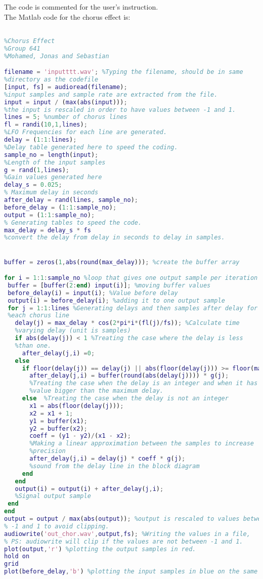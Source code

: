 \begin{lstlisting}[language=Matlab, caption= Matlab code for flanger effect]
\end{lstlisting}


The code is commented for the user's instruction.\\

The Matlab code for the chorus effect is:

\begin{lstlisting}[language=Matlab, caption= Matlab code for chorus effect]

%Chorus Effect
%Group 641
%Mohamed, Jonas and Sebastian

filename = 'inputttt.wav'; %Typing the filename, should be in same 
%directory as the codefile
[input, fs] = audioread(filename);
%input samples and sample rate are extracted from the file.
input = input / (max(abs(input)));
%the input is rescaled in order to have values between -1 and 1.
lines = 5; %number of chorus lines 
fl = randi(10,1,lines);
%LFO Frequencies for each line are generated.
delay = (1:1:lines);
%Delay table generated here to speed the coding. 
sample_no = length(input); 
%Length of the input samples
g = rand(1,lines); 
%Gain values generated here
delay_s = 0.025; 
% Maximum delay in seconds 
after_delay = rand(lines, sample_no); 
before_delay = (1:1:sample_no);
output = (1:1:sample_no);
% Generating tables to speed the code. 
max_delay = delay_s * fs  
%convert the delay from delay in seconds to delay in samples. 


buffer = zeros(1,abs(round(max_delay))); %create the buffer array 

for i = 1:1:sample_no %loop that gives one output sample per iteration
 buffer = [buffer(2:end) input(i)]; %moving buffer values
 before_delay(i) = input(i); %Value before delay
 output(i) = before_delay(i); %adding it to one output sample
 for j = 1:1:lines %Generating delays and then samples after delay for 
 %each chorus line
   delay(j) = max_delay * cos(2*pi*i*(fl(j)/fs)); %Calculate time  
   %varying delay (unit is samples)
   if abs(delay(j)) < 1 %Treating the case where the delay is less 
   %than one.
	 after_delay(j,i) =0;
   else
	 if floor(delay(j)) == delay(j) || abs(floor(delay(j))) >= floor(max_delay)
	   after_delay(j,i) = buffer(round(abs(delay(j)))) * g(j);
	   %Treating the case when the delay is an integer and when it has a
	   %value bigger than the maximum delay. 
	 else  %Treating the case when the delay is not an integer
	   x1 = abs(floor(delay(j)));
	   x2 = x1 + 1;
	   y1 = buffer(x1);
	   y2 = buffer(x2);
	   coeff = (y1 - y2)/(x1 - x2);
	   %Making a linear approximation between the samples to increase
	   %precision
	   after_delay(j,i) = delay(j) * coeff * g(j);  
	   %sound from the delay line in the block diagram
	 end
   end
   output(i) = output(i) + after_delay(j,i);
   %Signal output sample
 end
end
output = output / max(abs(output)); %output is rescaled to values between
% -1 and 1 to avoid clipping. 
audiowrite('out_chor.wav',output,fs); %Writing the values in a file, 
% PS: audiowrite will clip if the values are not between -1 and 1.
plot(output,'r') %plotting the output samples in red.
hold on
grid
plot(before_delay,'b') %plotting the input samples in blue on the same fig.




\end{lstlisting}
